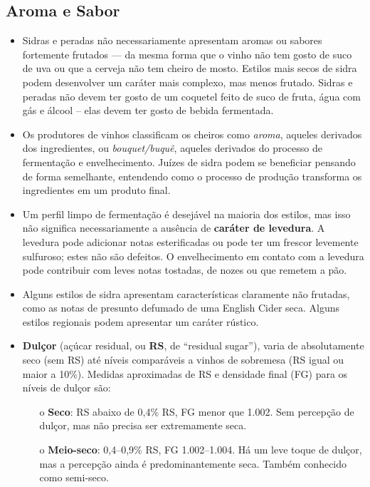 \subsection*{Aroma e Sabor}

\begin{itemize}
\item Sidras e peradas não necessariamente apresentam aromas ou sabores fortemente frutados — da mesma forma que o vinho não tem gosto de suco de uva ou que a cerveja não tem cheiro de mosto. Estilos mais secos de sidra podem desenvolver um caráter mais complexo, mas menos frutado. Sidras e peradas não devem ter gosto de um coquetel feito de suco de fruta, água com gás e álcool – elas devem ter gosto de bebida fermentada.
\item Os produtores de vinhos classificam os cheiros como \textit{aroma}, aqueles derivados dos ingredientes, ou \textit{bouquet/buquê}, aqueles derivados do processo de fermentação e envelhecimento. Juízes de sidra podem se beneficiar pensando de forma semelhante, entendendo como o processo de produção transforma os ingredientes em um produto final.
\item Um perfil limpo de fermentação é desejável na maioria dos estilos, mas isso não significa necessariamente a ausência de \textbf{caráter de levedura}. A levedura pode adicionar notas esterificadas ou pode ter um frescor levemente sulfuroso; estes não são defeitos. O envelhecimento em contato com a levedura pode contribuir com leves notas tostadas, de nozes ou que remetem a pão.
\item Alguns estilos de sidra apresentam características claramente não frutadas, como as notas de presunto defumado de uma English Cider seca. Alguns estilos regionais podem apresentar um caráter rústico.
\item \textbf{Dulçor} (açúcar residual, ou \textbf{RS}, de “residual sugar”), varia de absolutamente seco (sem RS) até níveis comparáveis a vinhos de sobremesa (RS igual ou maior a 10\%). Medidas aproximadas de RS e densidade final (FG) para os níveis de dulçor são:
  \begin{itemize}
  \item[o] \textbf{Seco}: RS abaixo de 0,4\% RS, FG menor que 1.002. Sem percepção de dulçor, mas não precisa ser extremamente seca.
  \item[o] \textbf{Meio-seco}: 0,4–0,9\% RS, FG 1.002–1.004. Há um leve toque de dulçor, mas a percepção ainda é predominantemente seca. Também conhecido como semi-seco.

\end{itemize}
\end{itemize}
